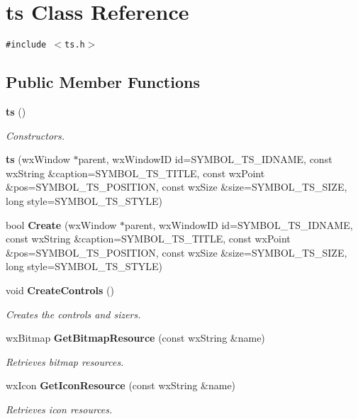 \section{ts Class Reference}
\label{classts}
{\tt \#include $<$ts.h$>$}

\subsection*{Public Member Functions}
\begin{CompactItemize}
\item 
{\bf ts} ()
\begin{CompactList}\small\item\em Constructors. \item\end{CompactList}\item 
\textbf{ts} (wx\-Window $\ast$parent, wx\-Window\-ID id=SYMBOL\_\-TS\_\-IDNAME, const wx\-String \&caption=SYMBOL\_\-TS\_\-TITLE, const wx\-Point \&pos=SYMBOL\_\-TS\_\-POSITION, const wx\-Size \&size=SYMBOL\_\-TS\_\-SIZE, long style=SYMBOL\_\-TS\_\-STYLE)\label{classts_5cc0c959a0e232dba5ec812c3ae57a12}

\item 
bool {\bf Create} (wx\-Window $\ast$parent, wx\-Window\-ID id=SYMBOL\_\-TS\_\-IDNAME, const wx\-String \&caption=SYMBOL\_\-TS\_\-TITLE, const wx\-Point \&pos=SYMBOL\_\-TS\_\-POSITION, const wx\-Size \&size=SYMBOL\_\-TS\_\-SIZE, long style=SYMBOL\_\-TS\_\-STYLE)
\item 
void {\bf Create\-Controls} ()
\begin{CompactList}\small\item\em Creates the controls and sizers. \item\end{CompactList}\item 
wx\-Bitmap {\bf Get\-Bitmap\-Resource} (const wx\-String \&name)
\begin{CompactList}\small\item\em Retrieves bitmap resources. \item\end{CompactList}\item 
wx\-Icon {\bf Get\-Icon\-Resource} (const wx\-String \&name)
\begin{CompactList}\small\item\em Retrieves icon resources. \item\end{CompactList}\end{CompactItemize}
